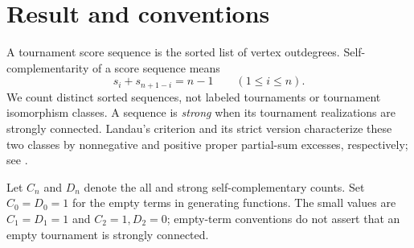 \documentclass[11pt,letterpaper]{article}
\theoremstyle{definition}\newtheorem{remark}[theorem]{Remark}
\begin{document}
\section{Result and conventions}\label{sct:sec:result}
A tournament score sequence is the sorted list of vertex outdegrees.
Self-complementarity of a score sequence means
\begin{equation}\label{sct:eq:complement}
 s_i+s_{n+1-i}=n-1\qquad(1\le i\le n).
\end{equation}
We count distinct sorted sequences, not labeled tournaments or tournament
isomorphism classes. A sequence is \emph{strong} when its tournament
realizations are strongly connected. Landau's criterion and its strict
version characterize these two classes by nonnegative and positive proper
partial-sum excesses, respectively; see \cite[Propositions 1 and 7]{stockmeyer}.

Let $C_n$ and $D_n$ denote the all and strong self-complementary counts.
Set $C_0=D_0=1$ for the empty terms in generating functions. The small values
are $C_1=D_1=1$ and $C_2=1,D_2=0$; empty-term conventions do not assert that an
empty tournament is strongly connected.
\end{document}
